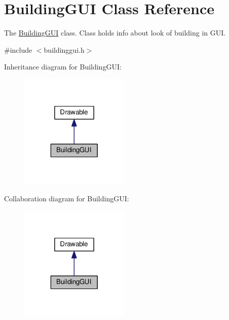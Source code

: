 \hypertarget{classBuildingGUI}{\section{Building\-G\-U\-I Class Reference}
\label{classBuildingGUI}
}


The \hyperlink{classBuildingGUI}{Building\-G\-U\-I} class. Class holds info about look of building in G\-U\-I.  




{\ttfamily \#include $<$buildinggui.\-h$>$}



Inheritance diagram for Building\-G\-U\-I\-:
\nopagebreak
\begin{figure}[H]
\begin{center}
\leavevmode
\includegraphics[width=148pt]{classBuildingGUI__inherit__graph}
\end{center}
\end{figure}


Collaboration diagram for Building\-G\-U\-I\-:
\nopagebreak
\begin{figure}[H]
\begin{center}
\leavevmode
\includegraphics[width=148pt]{classBuildingGUI__coll__graph}
\end{center}
\end{figure}
